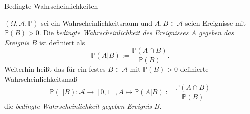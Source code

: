 \documentclass[
  8pt,
  ignorenonframetext,
]{beamer}
\begin{document}
\begin{frame}{Bedingte Wahrscheinlichkeiten}
\protect\hypertarget{bedingte-wahrscheinlichkeiten}{}
\small
\begin{definition}
\justifying
$(\Omega,\mathcal{A}, \mathbb{P})$ sei ein Wahrscheinlichkeitsraum und $A, B\in \mathcal{A}$
seien Ereignisse mit $\mathbb{P}(B) > 0$. Die \textit{bedingte Wahrscheinlichkeit des Ereignisses
$A$ gegeben das Ereignis $B$} ist definiert als
\begin{equation}
\mathbb{P}(A|B) := \frac{\mathbb{P}(A \cap B)}{\mathbb{P}(B)}.
\end{equation}
Weiterhin heißt das für ein festes $B \in \mathcal{A}$ mit $\mathbb{P}(B) > 0$ 
definierte Wahrscheinlichkeitsmaß
\begin{equation}
\mathbb{P}(\,\,|B) : \mathcal{A} \to [0,1],
A \mapsto \mathbb{P}(A|B) := \frac{\mathbb{P}(A \cap B)}{\mathbb{P}(B)}
\end{equation}
die \textit{bedingte Wahrscheinlichkeit gegeben Ereignis $B$}.
\end{definition}
\end{frame}
\end{document}
